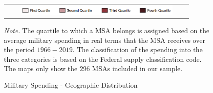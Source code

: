 \documentclass[dv_diss_main.tex]{subfiles}
\begin{document}
\begin{figure}[H]
\begin{center}
\begin{tabular}[c]{ccc}
    \multicolumn{3}{c}{\includegraphics[height=0.2in,width=3.8in]{figures/map_cbsa_legspend.png}} \\[0.1in]
      \end{tabular}
     \caption{Military Spending - Geographic Distribution}
\end{center}
   
    \footnotesize{\textit{Note. } The quartile to which a MSA belongs is assigned based on the average military spending in real terms that the MSA receives over the period $1966-2019$. The classification of the spending into the three categories is based on the Federal supply classification code. The maps only show the $296$ MSAs included in our sample.}
    \label{fig:map_spend}
\end{figure}
\newpage
\end{document}
